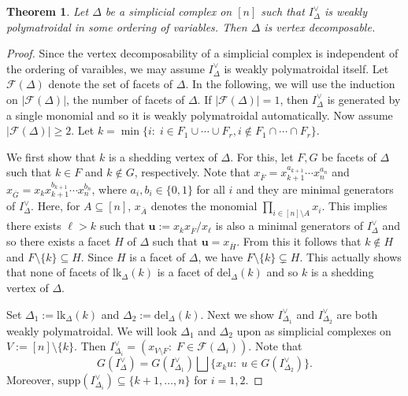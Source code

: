 \documentclass[12pt]{amsart}
\let\:=\colon
\newtheorem{Theorem}{Theorem}[section]
\begin{document}
\begin{Theorem} \label{main2} Let $\Delta$ be a simplicial complex on $[n]$ such that $I_{\Delta}^{\vee}$ is weakly polymatroidal in some ordering of   variables. Then  $\Delta$ is vertex decomposable.
\end{Theorem}

\begin{proof} Since the vertex decomposability of a simplicial complex is independent of the ordering of varaibles, we may assume $I_{\Delta}^{\vee}$ is weakly polymatroidal itself. Let $\mathcal{F}(\Delta)$ denote the set of facets of $\Delta$. In the following, we will  use the induction on $|\mathcal{F}(\Delta)|$, the number of facets of $\Delta$. If $|\mathcal{F}(\Delta)|=1$,  then $I_{\Delta}^{\vee}$ is generated by a single monomial and so it is weakly polymatroidal  automatically. Now assume $|\mathcal{F}(\Delta)|\geq 2$. Let $k=\min\{i\:\; i\in F_1\cup\cdots\cup F_r, i\notin F_1\cap\cdots\cap F_r\}$.

We first show that $k$ is a shedding vertex of $\Delta$.    For this, let $F,G$ be facets of $\Delta$ such that $k\in F$ and $k\notin G$, respectively.
Note that $x_{\overline{F}}=x_{k+1}^{a_{k+1}}\cdots x_n^{a_n}$ and $x_{\overline{G}}=x_kx_{k+1}^{b_{k+1}}\cdots x_n^{b_n}$, where $a_i,b_i\in \{0,1\}$ for all $i$ and they are minimal generators of $I_{\Delta}^{\vee}$. Here, for $A\subseteq [n]$, $x_{\overline{A}}$ denotes the monomial $\prod_{i\in [n]\setminus A}x_i$.   This implies there exists $\ell>k$ such that  $\mathbf{u}:=x_kx_{\overline{F}}/ x_{\ell}$ is also a minimal generators of $I_{\Delta}^{\vee}$ and so there exists a facet $H$ of $\Delta$ such that  $\mathbf{u}=x_{\overline{H}}$.  From this it follows that $k\notin H$ and $F\setminus \{k\} \subseteq H$. Since $H$ is  a facet of $\Delta$, we have $F\setminus \{k\}\subsetneq H$. This actually shows that none of facets of $\mathrm{lk}_{\Delta}(k)$ is  a facet of $\mathrm{del}_{\Delta}(k)$ and so $k$ is a shedding vertex of $\Delta$.

Set $\Delta_1:=\mathrm{lk}_{\Delta}(k)$
and $\Delta_2:=\mathrm{del}_{\Delta}(k)$. Next we show $I_{\Delta_1}^{\vee}$ and $I_{\Delta_2}^{\vee}$ are both weakly polymatroidal.  We will look $\Delta_1$ and $\Delta_2$ upon as simplicial complexes on $V:=[n]\setminus \{k\}$.
 Then $I_{\Delta_i}^{\vee}=(x_{V\setminus F}\:\; F\in \mathcal{F}(\Delta_i))$.   Note that
 \begin{equation}\label{D}
 G(I_{\Delta}^{\vee})=G(I_{\Delta_1}^{\vee})\bigsqcup \{x_ku\:\; u\in G(I_{\Delta_2}^{\vee})\}.
 \end{equation}
 Moreover, $\mathrm{supp}(I_{\Delta_i}^{\vee})\subseteq \{k+1,\ldots,n\}$ for $i=1,2$.


\end{proof}
\end{document}
